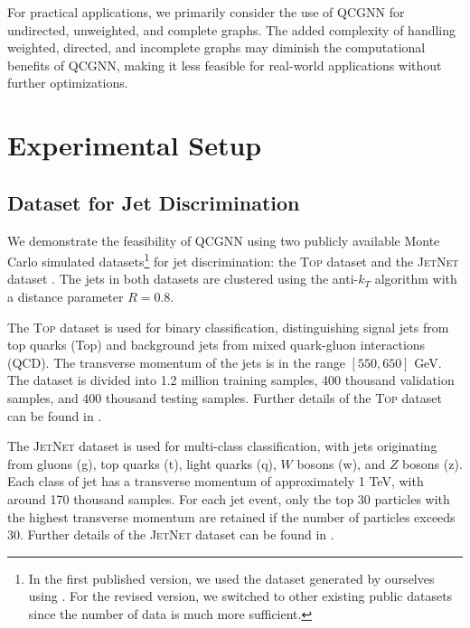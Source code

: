 \documentclass[reprint,amsmath,amssymb,prd,nofootinbib]{revtex4-2}
\newcommand{\Top}{\textsc{Top}\xspace}
\newcommand{\JetNet}{\textsc{JetNet}\xspace}
\begin{document}
For practical applications, we primarily consider the use of QCGNN for undirected, unweighted, and complete graphs. The added complexity of handling weighted, directed, and incomplete graphs may diminish the computational benefits of QCGNN, making it less feasible for real-world applications without further optimizations.

\section{Experimental Setup} \label{sec_setup}

\subsection{Dataset for Jet Discrimination} \label{sec_data_setup}
We demonstrate the feasibility of QCGNN using two publicly available Monte Carlo simulated datasets\footnote{In the first published version, we used the dataset generated by ourselves using \cite{mg5,delphes1,delphes2,pythia1,hvt}. For the revised version, we switched to other existing public datasets since the number of data is much more sufficient.} for jet discrimination: the \Top dataset \cite{zenodo_top} and the \JetNet dataset \cite{zenodo_jetnet}. The jets in both datasets are clustered using the anti-$k_T$ algorithm \cite{antikt,fastjet} with a distance parameter $R=0.8$.

The \Top dataset \cite{zenodo_top} is used for binary classification, distinguishing signal jets from top quarks (Top) and background jets from mixed quark-gluon interactions (QCD). The transverse momentum of the jets is in the range $[550, 650]$ GeV. The dataset is divided into 1.2 million training samples, 400 thousand validation samples, and 400 thousand testing samples. Further details of the \Top dataset can be found in \cite{dataset_top}.

The \JetNet dataset \cite{zenodo_jetnet} is used for multi-class classification, with jets originating from gluons (g), top quarks (t), light quarks (q), $W$ bosons (w), and $Z$ bosons (z). Each class of jet has a transverse momentum of approximately 1 TeV, with around 170 thousand samples. For each jet event, only the top 30 particles with the highest transverse momentum are retained if the number of particles exceeds 30. Further details of the \JetNet dataset can be found in \cite{dataset_jetnet}.
\end{document}
